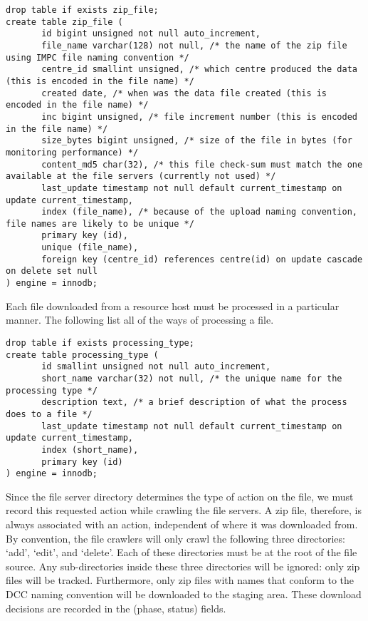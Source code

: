 \documentclass[a4paper,11pt]{article}
\begin{document}
\begin{landscape}
\begin{Verbatim}[fontsize=\small,formatcom=\color{blue}]
drop table if exists zip_file;
create table zip_file (
       id bigint unsigned not null auto_increment,
       file_name varchar(128) not null, /* the name of the zip file using IMPC file naming convention */
       centre_id smallint unsigned, /* which centre produced the data (this is encoded in the file name) */
       created date, /* when was the data file created (this is encoded in the file name) */
       inc bigint unsigned, /* file increment number (this is encoded in the file name) */
       size_bytes bigint unsigned, /* size of the file in bytes (for monitoring performance) */
       content_md5 char(32), /* this file check-sum must match the one available at the file servers (currently not used) */
       last_update timestamp not null default current_timestamp on update current_timestamp,
       index (file_name), /* because of the upload naming convention, file names are likely to be unique */
       primary key (id),
       unique (file_name),
       foreign key (centre_id) references centre(id) on update cascade on delete set null
) engine = innodb;
\end{Verbatim}

Each file downloaded from a resource host must be processed in a particular manner. The following list all of the ways of processing a file.

\begin{Verbatim}[fontsize=\small,formatcom=\color{blue}]
drop table if exists processing_type;
create table processing_type (
       id smallint unsigned not null auto_increment,
       short_name varchar(32) not null, /* the unique name for the processing type */
       description text, /* a brief description of what the process does to a file */
       last_update timestamp not null default current_timestamp on update current_timestamp,
       index (short_name),
       primary key (id)
) engine = innodb;
\end{Verbatim}

Since the file server directory determines the type of action on the file, we must record this requested action while crawling the file servers. A zip file, therefore, is always associated with an action, independent of where it was downloaded from. By convention, the file crawlers will only crawl the following three directories: `add', `edit', and `delete'. Each of these directories must be at the root of the file source. Any sub-directories inside these three directories will be ignored: only zip files will be tracked. Furthermore, only zip files with names that conform to the DCC naming convention will be downloaded to the staging area. These download decisions are recorded in the (phase, status) fields.


\end{landscape}
\end{document}
